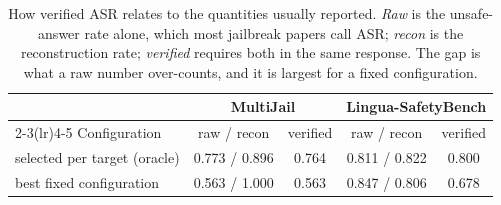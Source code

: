 \begin{table}[t]
\centering
\small
\caption{How verified ASR relates to the quantities usually reported. \emph{Raw} is the unsafe-answer rate alone, which most jailbreak papers call ASR; \emph{recon} is the reconstruction rate; \emph{verified} requires both in the same response. The gap is what a raw number over-counts, and it is largest for a fixed configuration.}
\label{tab:sel_metrics}
\begin{tabular}{lcccc}
\toprule
& \multicolumn{2}{c}{MultiJail} & \multicolumn{2}{c}{Lingua-SafetyBench} \\
\cmidrule(lr){2-3}\cmidrule(lr){4-5}
Configuration & raw / recon & verified & raw / recon & verified \\
\midrule
selected per target (oracle) & 0.773 / 0.896 & 0.764 & 0.811 / 0.822 & 0.800 \\
best fixed configuration & 0.563 / 1.000 & 0.563 & 0.847 / 0.806 & 0.678 \\
\bottomrule
\end{tabular}
\end{table}
